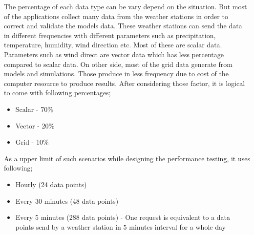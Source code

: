 The percentage of each data type can be vary depend on the situation. But most of the applications collect many data from the weather stations in order to correct and validate the models data. These weather stations can send the data in different frequencies with different parameters such as precipitation, temperature, humidity, wind direction etc.
Most of these are scalar data. Parameters such as wind direct are vector data which has less percentage compared to scalar data. On other side, most of the grid data generate from models and simulations. Those produce in less frequency due to cost of the computer resource to produce results. After considering those factor, it is logical to come with following percentages;
\begin{itemize}
    \item Scalar - 70\%
    \item Vector - 20\%
    \item Grid - 10\%
\end{itemize}

As a upper limit of such scenarios while designing the performance testing, it uses following;
\begin{itemize}
    \item Hourly (24 data points) 
    \item Every 30 minutes (48 data points)
    \item Every 5 minutes (288 data points) - One request is equivalent to a data points send by a weather station in 5 minutes interval for a whole day
\end{itemize}

